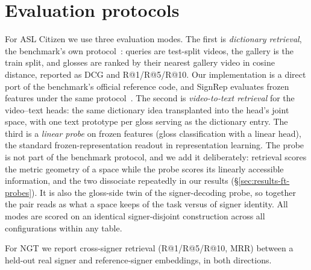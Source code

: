 \section{Evaluation protocols}
\label{sec:eval-protocols}
For ASL Citizen we use three evaluation modes. The first is
\emph{dictionary retrieval}, the benchmark's own
protocol~\cite{aslcitizen}: queries are test-split videos, the gallery
is the train split, and glosses are ranked by their nearest gallery
video in cosine distance, reported as DCG and R@1/R@5/R@10. Our
implementation is a direct port of the benchmark's official reference
code, and SignRep evaluates frozen features under the same
protocol~\cite{wongSignRepEnhancingSelfSupervised2025}. The second is
\emph{video-to-text retrieval} for the video--text heads: the same
dictionary idea transplanted into the head's joint space, with one text
prototype per gloss serving as the dictionary entry. The third is a
\emph{linear probe} on frozen features (gloss classification with a
linear head), the standard frozen-representation readout in
representation learning. The probe is not part of the benchmark
protocol, and we add it deliberately: retrieval scores the metric
geometry of a space while the probe scores its linearly accessible
information, and the two dissociate repeatedly in our results
(\S\ref{sec:results-ft-probes}). It is also the gloss-side twin of the
signer-decoding probe, so together the pair reads as what a space keeps
of the task versus of signer identity. All modes are scored on an
identical signer-disjoint construction across all configurations within
any table.

For NGT we report cross-signer retrieval
(R@1/R@5/R@10, MRR) between a held-out real signer and reference-signer
embeddings, in both directions. 

